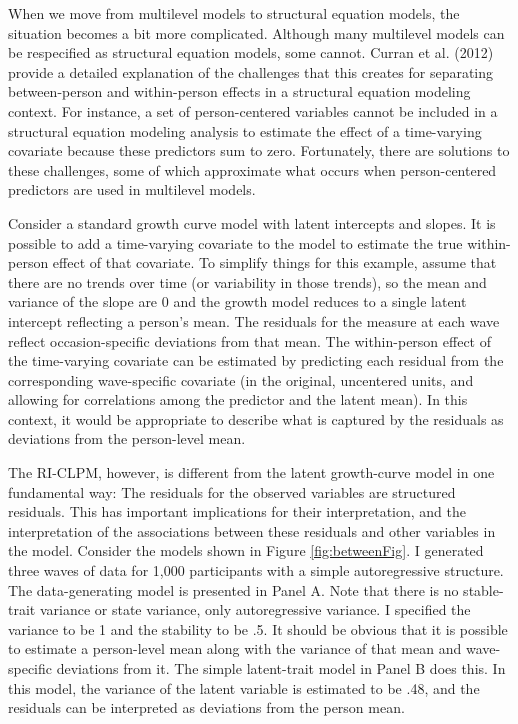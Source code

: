 \documentclass[
  english,
  man,floatsintext]{apa6}
\begin{document}
When we move from multilevel models to structural equation models, the situation becomes a bit more complicated. Although many multilevel models can be respecified as structural equation models, some cannot. Curran et al. (2012) provide a detailed explanation of the challenges that this creates for separating between-person and within-person effects in a structural equation modeling context. For instance, a set of person-centered variables cannot be included in a structural equation modeling analysis to estimate the effect of a time-varying covariate because these predictors sum to zero. Fortunately, there are solutions to these challenges, some of which approximate what occurs when person-centered predictors are used in multilevel models.

Consider a standard growth curve model with latent intercepts and slopes. It is possible to add a time-varying covariate to the model to estimate the true within-person effect of that covariate. To simplify things for this example, assume that there are no trends over time (or variability in those trends), so the mean and variance of the slope are 0 and the growth model reduces to a single latent intercept reflecting a person's mean. The residuals for the measure at each wave reflect occasion-specific deviations from that mean. The within-person effect of the time-varying covariate can be estimated by predicting each residual from the corresponding wave-specific covariate (in the original, uncentered units, and allowing for correlations among the predictor and the latent mean). In this context, it would be appropriate to describe what is captured by the residuals as deviations from the person-level mean.

The RI-CLPM, however, is different from the latent growth-curve model in one fundamental way: The residuals for the observed variables are structured residuals. This has important implications for their interpretation, and the interpretation of the associations between these residuals and other variables in the model. Consider the models shown in Figure \ref{fig:betweenFig}. I generated three waves of data for 1,000 participants with a simple autoregressive structure. The data-generating model is presented in Panel A. Note that there is no stable-trait variance or state variance, only autoregressive variance. I specified the variance to be 1 and the stability to be .5. It should be obvious that it is possible to estimate a person-level mean along with the variance of that mean and wave-specific deviations from it. The simple latent-trait model in Panel B does this. In this model, the variance of the latent variable is estimated to be .48, and the residuals can be interpreted as deviations from the person mean.
\end{document}
